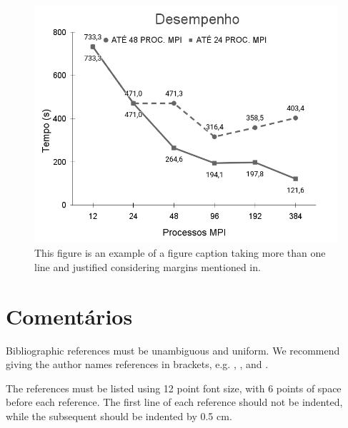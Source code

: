 \documentclass[12pt]{article}
\begin{document}
\begin{figure}[ht]
\centering
\includegraphics[width=.7\textwidth]{figures/perfpernode.png}
\caption{This figure is an example of a figure caption taking more than one line and justified considering margins mentioned in.}
\label{fig:48pernode}
\end{figure}


\section{Comentários}



Bibliographic references must be unambiguous and uniform.  We recommend giving
the author names references in brackets, e.g. \cite{knuth:84},
\cite{boulic:91}, and \cite{smith:99}.

The references must be listed using 12 point font size, with 6 points of space
before each reference. The first line of each reference should not be
indented, while the subsequent should be indented by 0.5 cm.



\end{document}
